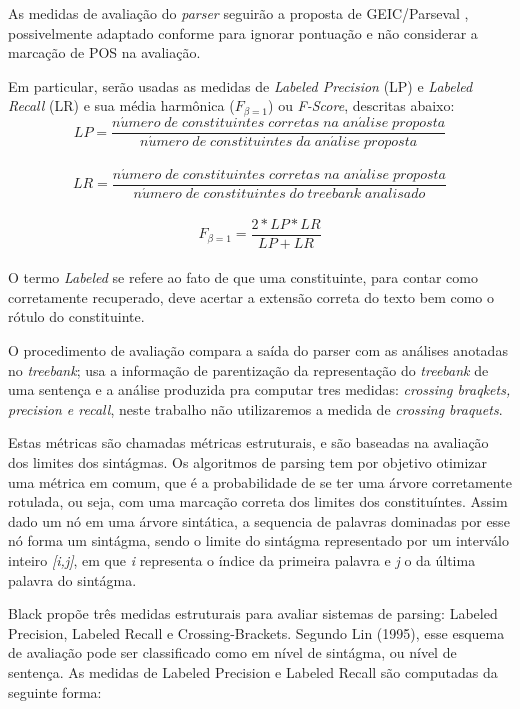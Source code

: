As medidas de avaliação do \emph{parser} seguirão a proposta de GEIC/Parseval \cite{black91}, possivelmente adaptado conforme \cite{collins97} para ignorar pontuação e não considerar a marcação de POS na avaliação. 

Em particular, serão usadas as medidas de \emph{Labeled Precision} (LP) e \emph{Labeled Recall} (LR) e sua média harmônica ($F_{\beta=1}$) ou \emph{F-Score}, descritas abaixo:
\\
$$LP = \frac{n\acute{u}mero\; de\; constituintes\; corretas\; na\; an\acute{a}lise\; proposta}{n\acute{u}mero\; de\; constituintes\; da\; an\acute{a}lise\; proposta}$$
\\
$$LR = \frac{n\acute{u}mero\; de\; constituintes\; corretas\; na\; an\acute{a}lise\; proposta}{n\acute{u}mero\; de\; constituintes\; do\; \mathit{treebank}\; analisado}$$
\\
$$F_{\beta=1} = \frac{2*LP*LR}{LP+LR}$$
\\
O termo \emph{Labeled} se refere ao fato de que uma constituinte, para contar como corretamente recuperado, deve acertar a extensão correta do texto bem como o rótulo do constituinte.

O procedimento de avaliação compara a saída do parser com as análises anotadas no \emph{treebank}; usa a informação de parentização da representação do \emph{treebank} de uma sentença e a análise produzida pra computar tres medidas: \emph{crossing braqkets, precision e recall}, neste trabalho não utilizaremos a medida de \emph{crossing braquets}.

Estas métricas são chamadas métricas estruturais, e são baseadas na avaliação dos limites dos sintágmas. Os algoritmos de parsing tem por objetivo otimizar uma métrica em comum, que é a probabilidade de se ter uma árvore corretamente rotulada, ou seja, com uma marcação correta dos limites dos constituíntes. Assim dado um nó em uma árvore sintática, a sequencia de palavras dominadas por esse nó forma um sintágma, sendo o limite do sintágma representado por um interválo inteiro \emph{[i,j]}, em que \emph{i} representa o índice da primeira palavra e \emph{j} o da última palavra do sintágma.

Black \cite{black91} propõe três medidas estruturais para avaliar sistemas de parsing: Labeled Precision, Labeled Recall e Crossing-Brackets. Segundo Lin (1995), esse esquema de avaliação pode ser classificado como em nível de sintágma, ou nível de sentença. 
As medidas de Labeled Precision e Labeled Recall são computadas da seguinte forma:

